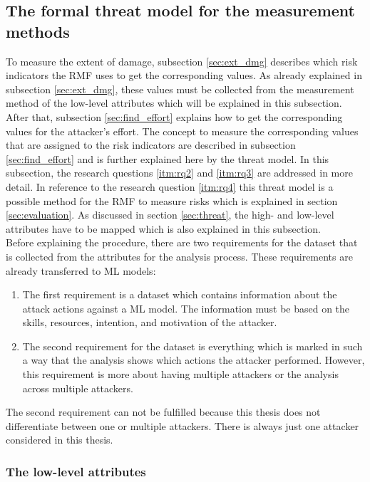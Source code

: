 \subsection{The formal threat model for the measurement methods}
\label{sec:use_threat_model}

To measure the extent of damage, subsection \ref{sec:ext_dmg} describes which risk indicators the RMF uses to get the corresponding values. As already explained in subsection \ref{sec:ext_dmg}, these values must be collected from the measurement method of the low-level attributes which will be explained in this subsection. After that, subsection \ref{sec:find_effort} explains how to get the corresponding values for the attacker's effort. The concept to measure the corresponding values that are assigned to the risk indicators are described in subsection \ref{sec:find_effort} and is further
explained here by the threat model. In this subsection, the research questions \ref{itm:rq2} and \ref{itm:rq3} are addressed in more detail. In reference to the research question \ref{itm:rq4} this
threat model is a possible method for the RMF to measure risks which is explained in section \ref{sec:evaluation}. As discussed in section \ref{sec:threat}, the high- and low-level attributes have to be mapped which is also explained in this subsection. \\
Before explaining the procedure, there are two requirements for the dataset that is collected from the attributes \cite{DBLP:conf/crisis/DoynikovaNGK20} for the analysis process. These requirements are already transferred to ML models:

\begin{enumerate}
  \item The first requirement is a dataset which contains information about the attack actions against a ML model. The information must be based on the skills, resources, intention, and motivation of the attacker.
  \item The second requirement for the dataset is everything which is marked in such a way that the analysis shows which actions the attacker performed. However, this requirement is more about having multiple attackers or the analysis across multiple attackers.
\end{enumerate}

The second requirement can not be fulfilled because this thesis does not differentiate between one or multiple attackers. There is always just one attacker considered in this thesis.

\subsubsection*{The low-level attributes}


